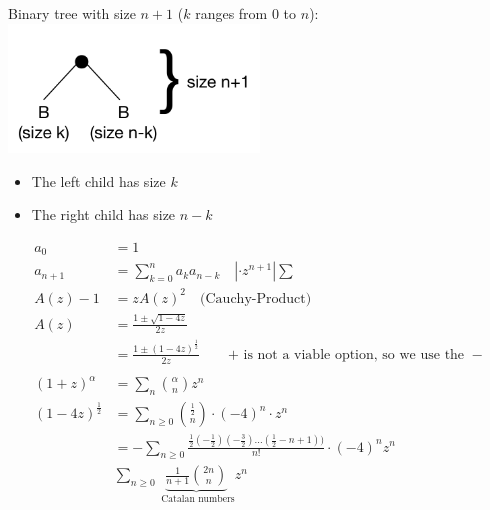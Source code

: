 \begin{center}
  Binary tree with size $n+1$ ($k$ ranges from $0$ to $n$):
  \includegraphics[width=0.5\textwidth]
    {02_higher_combinatorics/pics/BinaryTreeRecursion}
\end{center}
\begin{itemize}
  \item The left child has size $k$
  \item The right child has size $n-k$
\end{itemize}
\begin{align*}
    a_0 &= 1 \\
    a_{n+1} &= \sum_{k=0}^{n} a_k a_{n-k}
        \quad | \cdot z^{n+1} | \sum \\
    A(z) - 1 &= z A(z)^2
        \quad \text{(Cauchy-Product)} \\
    A(z) &= \frac{1 \pm \sqrt{1-4z}}{2z}\\
        &= \frac{1 \pm (1-4z)^\frac1{2}}{2z} \qquad
    \text{$+$ is not a viable option, so we use the $-$} \\
     \\
    (1 + z)^\alpha &= \sum_n {\binom{\alpha}{ n}} z^n \\
    (1-4z)^\frac1{2} &= \sum_{n \geq 0} \binom{\frac12}{n} \cdot (-4)^n \cdot z^n\\
	&= - \sum_{n\geq 0} \frac{\frac12 (-\frac12) (-\frac32) \ldots (\frac12 - n+1))}{n!} \cdot (-4)^n z^n \\
    &\sum_{n\geq 0} \underbrace{\frac{1}{n+1} {\binom{2n}{n}}}_{\text{ Catalan numbers}} z^n
\end{align*}
